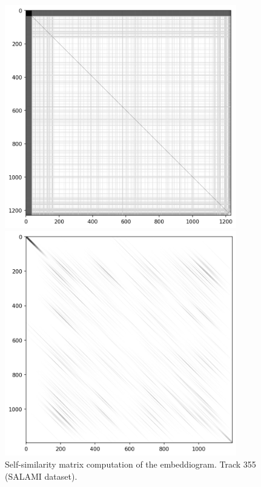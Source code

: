\begin{figure}[ht]
    \centering
    \begin{minipage}{0.45\textwidth}
        \centering
        \includegraphics[width=0.9\textwidth]{figures/images/355recurrencematrix.png} %
        \caption[Self-similarity matrix | Track 355 (SALAMI dataset)]{Self-similarity matrix computation of the embeddiogram. Track 355 (SALAMI dataset).}
        \label{fig:SSM}
    \end{minipage}\hfill
    \begin{minipage}{0.45\textwidth}
        \centering
        \includegraphics[width=0.9\textwidth]{figures/images/355lagmatrixgaussiansmoothing.png} %

\end{minipage}
\end{figure}

